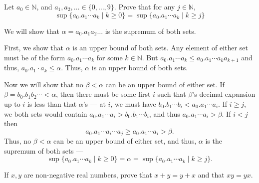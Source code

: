 \documentclass[12 pt, letterpaper]{hmcpset}
\begin{document}
\begin{problem}[1.]
	Let $a_{0} \in \mathbb{N}$, and $a_{1}, a_{2}, \dots \in \{ 0, \dots, 9 \}$. Prove that for any  $j \in \mathbb{N}$,
	\[
		\sup \{ a_{0}.a_{1} \cdots a_{k} \mid k \ge 0 \} = \sup \{ a_{0}.a_{1} \cdots a_{k} \mid k \ge j \}
	\]
\end{problem}

\begin{solution}
	We will show that $\alpha = a_{0}.a_{1} a_{2} \dots$ is the supremum of both sets.

	First, we show that $\alpha$ is an upper bound of both sets. Any element of either set must be of the form $a_{0}.a_{1} \cdots a_{k}$ for some $k \in \mathbb{N}$. But $a_{0}.a_{1} \cdots a_{k} \le a_{0}.a_{1} \cdots a_{k} a_{k + 1}$ and thus, $a_{0}.a_{1} \cdot a_{k} \le \alpha$. Thus, $\alpha$ is an upper bound of both sets.

	Now we will show that no $\beta < \alpha$ can be an upper bound of either set. If $\beta = b_{0}.b_{1} b_{2} \cdots < \alpha$, then there must be some first $i$ such that $\beta$'s decimal expansion up to $i$ is less than that $\alpha$'s --- at $i$, we must have $b_{0}.b_{1} \cdots b_{i} < a_{0}.a_{1} \cdots a_{i}$. If $i \ge j$, we both sets would contain $a_{0}.a_{1} \cdots a_{i} > b_{0}.b_{1} \cdots b_{i}$, and thus $a_{0}.a_{1} \cdots a_{i} > \beta$. If $i < j$ then
	 \[
		a_{0}.a_{1} \cdots a_{i} \cdots a_{j} \ge a_{0}.a_{1} \cdots a_{i} > \beta.
	\]
	Thus, no $\beta < \alpha$ can be an upper bound of either set, and thus, $\alpha$ is the supremum of both sets ---
	\[
		\sup \{ a_{0}.a_{1} \cdots a_{k} \mid k \ge 0 \} = \alpha = \sup \{ a_{0}.a_{1} \cdots a_{k} \mid k \ge j \}.
	\]
\end{solution}

\pagebreak

\begin{problem}[2.]
	If $x, y$ are non-negative real numbers, prove that $x + y = y + x$ and that $xy = yx$.
\end{problem}
\end{document}

